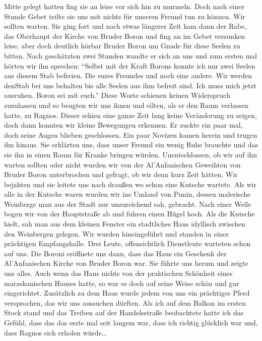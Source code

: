 Mitte gelegt hatten fing sie an leise vor sich hin zu murmeln. Doch nach einer Stunde Gebet teilte sie uns mit nichts für unseren Freund tun zu können. Wir sollten warten. Sie ging fort und nach etwas längerer Zeit kam dann der Rabe, das Oberhaupt der Kirche von Bruder Boron und fing an im Gebet versunken leise, aber doch deutlich hörbar Bruder Boron um Gnade für diese Seelen zu bitten. Nach geschätzten zwei Stunden wandte er sich an uns und zum ersten mal hörten wir ihn sprechen: ``Selbst mit der Kraft Borons konnte ich nur zwei Seelen aus diesem Stab befreien. Die eures Freundes und noch eine andere. Wir werden denStab bei uns behalten bis alle Seelen aus ihm befreit sind. Ich muss mich jetzt ausruhen. Boron sei mit euch.'' Diese Worte schienen keinen Widerspruch zuzulassen und so beugten wir uns ihnen und eilten, als er den Raum verlassen hatte, zu Ragnos. Dieser schien eine ganze Zeit lang keine Veränderung zu zeigen, doch dann konnten wir kleine Bewegungen erkennen. Er zuckte ein paar mal, doch seine Augen blieben geschlossen. Ein paar Novizen kamen herein und trugen ihn hinaus. Sie erklärten uns, dass unser Freund ein wenig Ruhe brauchte und das sie ihn in einen Raum für Kranke bringen würden. Unentschlossen, ob wir auf ihn warten sollten oder nicht wurden wir von der Al'Anfanischen Geweihten von Bruder Boron unterbrochen und gefragt, ob wir denn kurz Zeit hätten. Wir bejahten und sie leitete uns nach draußen wo schon eine Kutsche wartete. Als wir alle in der Kutsche waren wurden wir ins Umland von Punin, dessen malerische Weinberge man aus der Stadt nur unzureichend sah, gebracht. Nach einer Weile bogen wir von der Hauptstraße ab und fuhren einen Hügel hoch. Als die Kutsche hielt, sah man aus dem kleinen Fenster ein stadtliches Haus idyllisch zwischen den Weinbergen gelegen. Wir wurden hineingeführt und standen in einer prächtigen Empfangshalle. Drei Leute, offensichtlich Dienstleute warteten schon auf uns. Die Boroni eröffnete uns dann, dass das Haus ein Geschenk der Al'Anfanischen Kirche von Bruder Boron war. Sie führte uns herum und zeigte uns alles. Auch wenn das Haus nichts von der praktischen Schönheit eines maraskanischen Hauses hatte, so war es doch auf seine Weise schön und gur eingerichtet. Zusätzlich zu dem Haus wurde jedem von uns ein prächtiges Pferd versprochen, das wir uns aussuchen dürften. Als ich auf dem Balkon im ersten Stock stand und das Treiben auf der Handelsstraße beobachtete hatte ich das Gefühl, dass das das erste mal seit langem war, dass ich richtig glücklich war und, dass Ragnos sich erholen würde\dots

